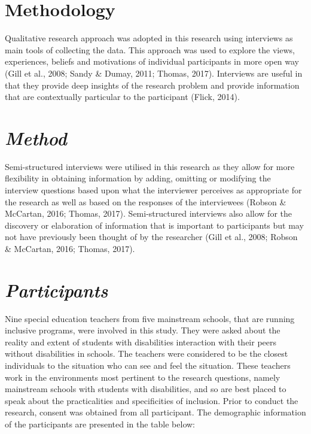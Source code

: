 \documentclass[11pt]{sig-alternate}
\begin{document}
\begin{large}
\section*{Methodology}
Qualitative research approach was adopted in this research using interviews as main tools of collecting the data. This approach was used to explore the views, experiences, beliefs and motivations of individual participants in more open way (Gill et al., 2008; Sandy \& Dumay, 2011; Thomas, 2017). Interviews are useful in that they provide deep insights of the research problem and provide information that are contextually particular to the participant (Flick, 2014). 
\section*{\textit{Method}}
Semi-structured interviews were utilised in this research as they allow for more flexibility in obtaining information by adding, omitting or modifying the interview questions based upon what the interviewer perceives as appropriate for the research as well as based on the responses of the interviewees (Robson \& McCartan, 2016; Thomas, 2017). Semi-structured interviews also allow for the discovery or elaboration of information that is important to participants but may not have previously been thought of by the researcher (Gill et al., 2008; Robson \& McCartan, 2016; Thomas, 2017). 
\section*{\textit{Participants}}
Nine special education teachers from five mainstream schools, that are running inclusive programs, were involved in this study. They were asked about the reality and extent of students with disabilities interaction with their peers without disabilities in schools. The teachers were considered to be the closest individuals to the situation who can see and feel the situation. These teachers work in the environments most pertinent to the research questions, namely mainstream schools with students with disabilities, and so are best placed to speak about the practicalities and specificities of inclusion. Prior to conduct the research, consent was obtained from all participant. The demographic information of the participants are presented in the table below: 


\end{large}
\end{document}
